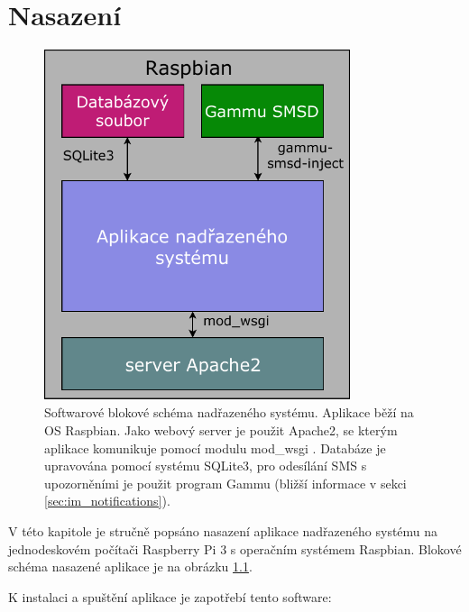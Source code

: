 \chapter{Nasazení}
\label{sec:dp}

\begin{figure}[h!]
    \centering
    \includegraphics[width=0.8\textwidth]{images/sw_block.pdf}
    \caption[Softwarové blokové schéma nadřazeného systému]{Softwarové blokové schéma nadřazeného systému. Aplikace běží na OS Raspbian. Jako webový server je použit Apache2, se kterým aplikace komunikuje pomocí modulu mod\_wsgi \cite{mod_wsgi}. Databáze je upravována pomocí systému SQLite3, pro odesílání SMS s upozorněními je použit program Gammu (bližší informace v sekci \ref{sec:im_notifications}).}
    \label{fig:sw_block}
\end{figure}

V této kapitole je stručně popsáno nasazení aplikace nadřazeného systému na jednodeskovém počítači Raspberry Pi 3 s operačním systémem Raspbian. Blokové schéma nasazené aplikace je na obrázku \ref{fig:sw_block}. 

K instalaci a spuštění aplikace je zapotřebí tento software:


